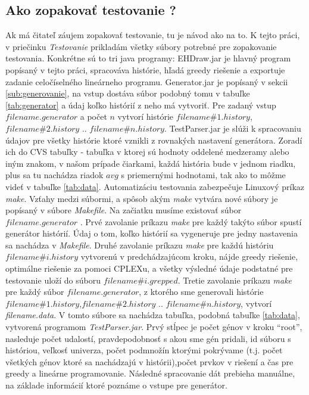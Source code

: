 \subsection{Ako zopakovať testovanie ?}
Ak má čitateľ záujem zopakovať testovanie, tu je návod ako na to.
K tejto práci, v priečinku \emph{Testovanie} prikladám všetky súbory potrebné pre zopakovanie testovania.
Konkrétne sú to tri java programy: EHDraw.jar je hlavný program popísaný v tejto práci, spracováva histórie, hľadá greedy riešenie a exportuje zadanie celočíselného lineárneho programu.
Generator.jar je popísaný v sekcii \ref{sub:generovanie}, na vstup dostáva súbor podobný tomu v tabuľke \ref{tab:generator} a údaj koľko histórií z neho má vytvoriť.
Pre zadaný vstup $filename.generator$ a počet $n$ vytvorí histórie $filename\#1.history$,$filename\#2.history$ .. $filename\#n.history$.
TestParser.jar je slúži k spracovaniu údajov pre všetky histórie ktoré vznikli z rovnakých nastavení generátora. Zoradí ich do CVS tabuľky - 
tabuľka v ktorej sú hodnoty oddelené medzeramy alebo iným znakom, v našom prípade čiarkami,
každá história bude v jednom riadku, plus sa tu nachádza riadok $avg$ s priemernými hodnotami, tak ako to môžme videť v tabuľke \ref{tab:data}.
Automatizáciu testovania zabezpečuje Linuxový príkaz \emph{make}. Vzťahy medzi súbormi, a spôsob akým \emph{make} vytvára nové súbory je popísaný v súbore \emph{Makefile}.
Na začiatku musíme existovať súbor $filename.generator$ . Prvé zavolanie príkazu \emph{make} pre každý takýto súbor spustí generátor histórií.
Údaj o tom, koľko histórií sa vygeneruje pre jedny nastavenia sa nachádza v \emph{Makefile}.
Druhé zavolanie príkazu \emph{make} pre každú históriu $filename\#i.history$ vytvorenú v predchádzajúcom kroku, nájde greedy riešenie, optimálne riešenie za pomoci CPLEXu,
a všetky výsledné údaje podstatné pre testovanie uloží do súboru $filename\#i.grepped$.
Tretie zavolanie príkazu \emph{make} pre každý súbor $filename.generator$, z ktorého sme generovali histórie $filename\#1.history$,$filename\#2.history$ .. $filename\#n.history$, vytvorí \emph{filename.data}.
V tomto súbore sa nachádza tabuľka, podobná tabuľke \ref{tab:data}, vytvorená programom \emph{TestParser.jar}.
Prvý stĺpec je počet génov v kroku ``root'', nasleduje počet udalostí, pravdepodobnosť s akou sme gén pridali, id súboru s históriou, veľkosť univerza,
počet podmnožín ktorými pokrývame (t.j. počet všetkých génov ktoré sa nachádzajú v histórii),počet prvkov v riešení a čas pre greedy a lineárne programovanie.
Následné spracovanie dát prebieha manuálne, na základe informácií ktoré poznáme o vstupe pre generátor.
